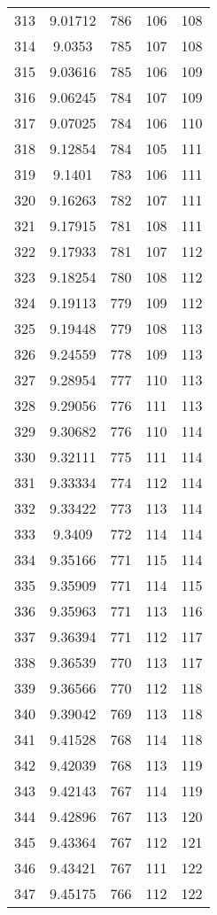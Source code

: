 \documentclass[12pt,a4paper]{article}
\begin{document}
\begin{tabular}{r|cccc}
	313 & 9.01712 & 786 & 106 & 108 \\
	314 & 9.0353 & 785 & 107 & 108 \\
	315 & 9.03616 & 785 & 106 & 109 \\
	316 & 9.06245 & 784 & 107 & 109 \\
	317 & 9.07025 & 784 & 106 & 110 \\
	318 & 9.12854 & 784 & 105 & 111 \\
	319 & 9.1401 & 783 & 106 & 111 \\
	320 & 9.16263 & 782 & 107 & 111 \\
	321 & 9.17915 & 781 & 108 & 111 \\
	322 & 9.17933 & 781 & 107 & 112 \\
	323 & 9.18254 & 780 & 108 & 112 \\
	324 & 9.19113 & 779 & 109 & 112 \\
	325 & 9.19448 & 779 & 108 & 113 \\
	326 & 9.24559 & 778 & 109 & 113 \\
	327 & 9.28954 & 777 & 110 & 113 \\
	328 & 9.29056 & 776 & 111 & 113 \\
	329 & 9.30682 & 776 & 110 & 114 \\
	330 & 9.32111 & 775 & 111 & 114 \\
	331 & 9.33334 & 774 & 112 & 114 \\
	332 & 9.33422 & 773 & 113 & 114 \\
	333 & 9.3409 & 772 & 114 & 114 \\
	334 & 9.35166 & 771 & 115 & 114 \\
	335 & 9.35909 & 771 & 114 & 115 \\
	336 & 9.35963 & 771 & 113 & 116 \\
	337 & 9.36394 & 771 & 112 & 117 \\
	338 & 9.36539 & 770 & 113 & 117 \\
	339 & 9.36566 & 770 & 112 & 118 \\
	340 & 9.39042 & 769 & 113 & 118 \\
	341 & 9.41528 & 768 & 114 & 118 \\
	342 & 9.42039 & 768 & 113 & 119 \\
	343 & 9.42143 & 767 & 114 & 119 \\
	344 & 9.42896 & 767 & 113 & 120 \\
	345 & 9.43364 & 767 & 112 & 121 \\
	346 & 9.43421 & 767 & 111 & 122 \\
	347 & 9.45175 & 766 & 112 & 122 \\

\end{tabular}
\end{document}
